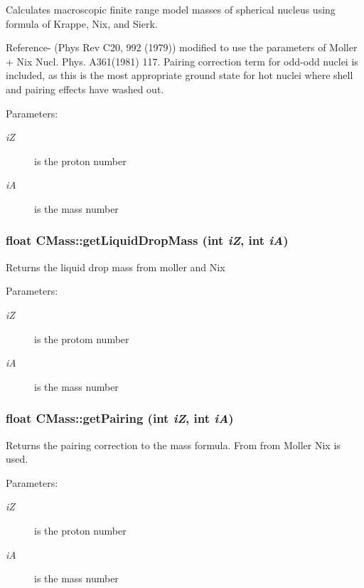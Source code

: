Calculates macroscopic finite range model masses of spherical nucleus using formula of Krappe, Nix, and Sierk.

Reference- (Phys Rev C20, 992 (1979)) modified to use the parameters of Moller + Nix Nucl. Phys. A361(1981) 117. Pairing correction term for odd-odd nuclei is included, as this is the most appropriate ground state for hot nuclei where shell and pairing effects have washed out. \begin{Desc}
\item[Parameters:]
\begin{description}
\item[{\em i\-Z}]is the proton number \item[{\em i\-A}]is the mass number \end{description}
\end{Desc}
\subsubsection{\setlength{\rightskip}{0pt plus 5cm}float CMass::get\-Liquid\-Drop\-Mass (int {\em i\-Z}, int {\em i\-A})}\label{classCMass_360701840914ad23d7ed3c3874ce0fc1}


Returns the liquid drop mass from moller and Nix \begin{Desc}
\item[Parameters:]
\begin{description}
\item[{\em i\-Z}]is the protom number \item[{\em i\-A}]is the mass number \end{description}
\end{Desc}
\subsubsection{\setlength{\rightskip}{0pt plus 5cm}float CMass::get\-Pairing (int {\em i\-Z}, int {\em i\-A})}\label{classCMass_57d4167da3dd5783572dffacd3f1f644}


Returns the pairing correction to the mass formula. From from Moller Nix is used. \begin{Desc}
\item[Parameters:]
\begin{description}
\item[{\em i\-Z}]is the proton number \item[{\em i\-A}]is the mass number \end{description}
\end{Desc}
